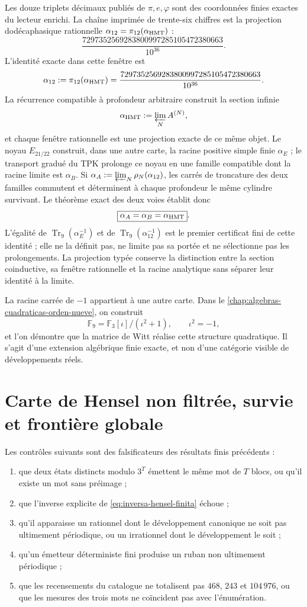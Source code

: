 Les douze triplets décimaux publiés de \(\pi,e,\varphi\) sont des coordonnées
finies exactes du lecteur enrichi. La chaîne imprimée de trente-six
chiffres est la projection dodécaphasique rationnelle
\(\alpha_{12}=\pi_{12}(\alpha_{\rm HMT})\) :
\[
\frac{7297352569283800997285105472380663}{10^{36}}.
\]
L'identité exacte dans cette fenêtre est
\[
\alpha_{12}
:=\pi_{12}(\alpha_{\rm HMT})
=\frac{7297352569283800997285105472380663}{10^{36}}.
\]
La récurrence compatible à profondeur arbitraire construit la section
infinie
\[
 \alpha_{\rm HMT}:=\varprojlim_N A^{(N)},
\]
et chaque fenêtre rationnelle est une projection exacte de ce même objet. Le
noyau \(E_{21/22}\) construit, dans une autre carte, la racine positive simple
finie \(\alpha_E\) ; le transport gradué du TPK prolonge ce noyau en
une famille compatible dont la racine limite est \(\alpha_B\). Si
\(\alpha_A:=\varprojlim_N\rho_N(\alpha_{12})\), les carrés de troncature
des deux familles commutent et déterminent à chaque profondeur le même
cylindre survivant. Le théorème exact des deux voies établit donc
\[
 \boxed{\alpha_A=\alpha_B=\alpha_{\rm HMT}}.
\]
L'égalité de \(\operatorname{Tr}_9(\alpha_E^{-1})\) et de
\(\operatorname{Tr}_9(\alpha_{12}^{-1})\) est le premier certificat fini de
cette identité ; elle ne la définit pas, ne limite pas sa portée et ne sélectionne pas les
prolongements. La projection typée conserve la distinction entre la section
coinductive, sa fenêtre rationnelle et la racine analytique sans séparer leur identité
à la limite.

La racine carrée de \(-1\) appartient à une autre carte. Dans le
\cref{chap:algebras-cuadraticas-orden-nueve}, on construit
\[
\mathbb F_9=\mathbb F_3[\iota]/(\iota^2+1),
\qquad \iota^2=-1,
\]
et l'on démontre que la matrice de Witt réalise cette structure quadratique. Il s'agit
d'une extension algébrique finie exacte, et non d'une catégorie visible de
développements réels.

\section{Carte de Hensel non filtrée, survie et frontière globale}

Les contrôles suivants sont des falsificateurs des résultats finis
précédents :
\begin{enumerate}
\item que deux états distincts modulo \(3^T\) émettent le même mot de
\(T\) blocs, ou qu'il existe un mot sans préimage ;
\item que l'inverse explicite de
\cref{eq:inversa-hensel-finita} échoue ;
\item qu'il apparaisse un rationnel dont le développement canonique ne soit pas ultimement
périodique, ou un irrationnel dont le développement le soit ;
\item qu'un émetteur déterministe fini produise un ruban non ultimement
périodique ;
\item que les recensements du catalogue ne totalisent pas \(468\), \(243\) et \(104\,976\),
ou que les mesures des trois mots ne coïncident pas avec l'énumération.
\end{enumerate}

